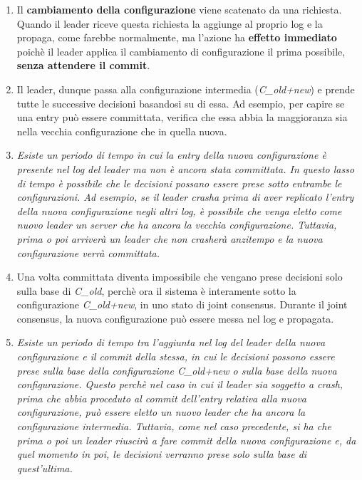     \begin{enumerate}
      \item{Il \textbf{cambiamento della configurazione} viene scatenato da una richiesta. Quando il leader riceve questa richiesta la aggiunge al proprio log e la propaga, come farebbe normalmente, ma l'azione ha \textbf{effetto immediato} poichè il leader applica il cambiamento di configurazione il prima possibile, \textbf{senza attendere il commit}.}

      \item{Il leader, dunque passa alla configurazione intermedia (\textit{C\_old+new}) e prende tutte le successive decisioni basandosi su di essa. Ad esempio, per capire se una entry può essere committata, verifica che essa abbia la maggioranza sia nella vecchia configurazione che in quella nuova.} 

      \item{\emph{Esiste un periodo di tempo in cui la entry della nuova configurazione è presente nel log del leader ma non è ancora stata committata. 
      In questo lasso di tempo è possibile che le decisioni possano essere prese sotto entrambe le configurazioni. Ad esempio, se il leader crasha prima di aver replicato l'entry della nuova configurazione negli altri log, è possibile che venga eletto come nuovo leader un server che ha ancora la vecchia configurazione.
      Tuttavia, prima o poi arriverà un leader che non crasherà anzitempo e la nuova configurazione verrà committata. }} 

      \item{Una volta committata diventa impossibile che vengano prese decisioni solo sulla base di \textit{C\_old}, perchè ora il sistema è interamente sotto la configurazione \textit{C\_old+new}, in uno stato di joint consensus.
      Durante il joint consensus, la nuova configurazione può essere messa nel log e propagata.} 


      \item{\emph{Esiste un periodo di tempo tra l'aggiunta nel log del leader della nuova configurazione e il commit della stessa, in cui le decisioni possono essere prese sulla base della configurazione \textit{C\_old+new} o sulla base della nuova configurazione. 
      Questo perchè nel caso in cui il leader sia soggetto a crash, prima che abbia proceduto al commit dell'entry relativa alla nuova configurazione, può essere eletto un nuovo leader che ha ancora la configurazione intermedia. Tuttavia, come nel caso precedente, si ha che prima o poi un leader riuscirà a fare commit della nuova configurazione e, da quel momento in poi, le decisioni verranno prese solo sulla base di quest'ultima.}} 

    \end{enumerate}

